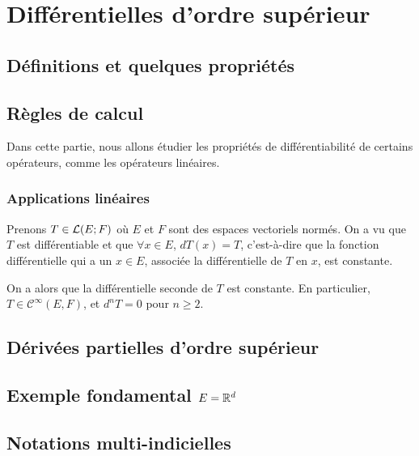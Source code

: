 \section{Différentielles d'ordre supérieur}

\subsection{Définitions et quelques propriétés}

\subsection{Règles de calcul}

Dans cette partie, nous allons étudier les propriétés de différentiabilité de
certains opérateurs, comme les opérateurs linéaires.

\subsubsection{Applications linéaires}

Prenons $T \in \mathcal{L}(E; F)$ où $E$ et $F$ sont des espaces vectoriels
normés.
On a vu que $T$ est différentiable et que $\forall x \in E$, $dT(x) = T$,
c'est-à-dire que la fonction différentielle qui a un $x \in E$, associée la
différentielle de $T$ en $x$, est constante.

On a alors que la différentielle seconde de $T$ est constante. En particulier,
$T \in \mathcal{C}^{\infty}(E, F)$, et $d^{n}T = 0$ pour $n \geq 2$.

\subsection{Dérivées partielles d'ordre supérieur}

\subsection{Exemple fondamental $E = \mathbb{R}^{d}$}

\subsection{Notations multi-indicielles}

